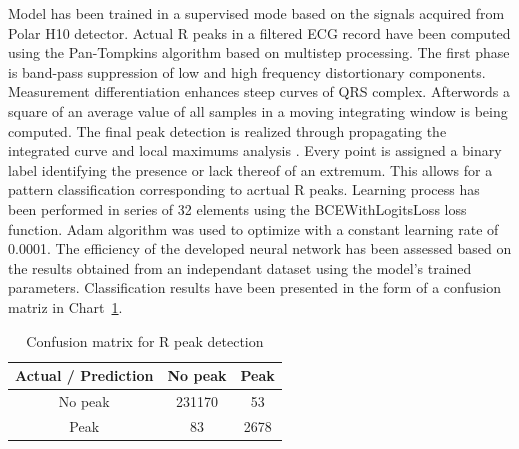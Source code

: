 \documentclass[journal]{IEEEtran}
\begin{document}
{Model has been trained in a supervised mode based on the signals acquired from Polar H10 detector. Actual R peaks in a filtered ECG record have been computed using the Pan-Tompkins algorithm based on multistep processing. The first phase is band-pass suppression of low and high frequency distortionary components. Measurement differentiation enhances steep curves of QRS complex. Afterwords a square of an average value of all samples in a moving integrating window is being computed. The final peak detection is realized through propagating the integrated curve and local maximums analysis \cite{27}.
Every point is assigned a binary label identifying the presence or lack thereof of an extremum. This allows for a pattern classification corresponding to acrtual R peaks.
\newpage
Learning process has been performed in series of 32 elements using the BCEWithLogitsLoss loss function. Adam algorithm was used to optimize with a constant learning rate of 0.0001. The efficiency of the developed neural network has been assessed based on the results obtained from an independant dataset using the model's trained parameters. Classification results have been presented in the form of a confusion matriz in Chart~\ref{tab:conf_matrix}.


\begin{table}[ht]
\centering
\caption{Confusion matrix for R peak detection}
\label{tab:conf_matrix}
\begin{tabular}{|c|c|c|}
\hline
\textbf{Actual / Prediction} & \textbf{No peak } & \textbf{Peak } \\
\hline
No peak  & 231170 & 53 \\
Peak  & 83 & 2678 \\
\hline
\end{tabular}
\end{table}

}
\end{document}
